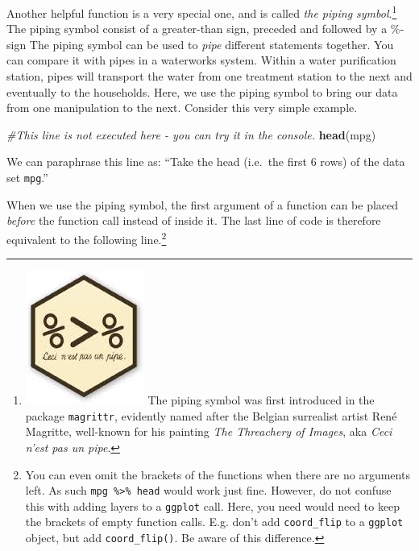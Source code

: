 \documentclass[]{tufte-book}
\newenvironment{Shaded}{}{}
\newcommand{\CommentTok}[1]{\textcolor[rgb]{0.38,0.63,0.69}{\textit{#1}}}
\newcommand{\KeywordTok}[1]{\textcolor[rgb]{0.00,0.44,0.13}{\textbf{#1}}}
\newcommand{\NormalTok}[1]{#1}
\newcommand{\OperatorTok}[1]{\textcolor[rgb]{0.40,0.40,0.40}{#1}}
\newcommand{\StringTok}[1]{\textcolor[rgb]{0.25,0.44,0.63}{#1}}
\begin{document}
Another helpful function is a very special one, and is called \emph{the piping symbol}.\footnote{\includegraphics{images/pipe.jpg} The piping symbol was first introduced in the package \texttt{magrittr}, evidently named after the Belgian surrealist artist René Magritte, well-known for his painting \emph{The Threachery of Images}, aka \emph{Ceci n'est pas un pipe}.} The piping symbol consist of a greater-than sign, preceded and followed by a \%-sign The piping symbol can be used to \emph{pipe} different statements together. You can compare it with pipes in a waterworks system. Within a water purification station, pipes will transport the water from one treatment station to the next and eventually to the households. Here, we use the piping symbol to bring our data from one manipulation to the next. Consider this very simple example.

\begin{Shaded}
\begin{Highlighting}[]
\CommentTok{#This line is not executed here - you can try it in the console.}
\KeywordTok{head}\NormalTok{(mpg)}
\end{Highlighting}
\end{Shaded}

We can paraphrase this line as: ``Take the head (i.e.~the first 6 rows) of the data set \texttt{mpg}.''

When we use the piping symbol, the first argument of a function can be placed \emph{before} the function call instead of inside it. The last line of code is therefore equivalent to the following line.\footnote{You can even omit the brackets of the functions when there are no arguments left. As such \texttt{mpg\ \%\textgreater{}\%\ head} would work just fine. However, do not confuse this with adding layers to a \texttt{ggplot} call. Here, you need would need to keep the brackets of empty function calls. E.g. don't add \texttt{coord\_flip} to a \texttt{ggplot} object, but add \texttt{coord\_flip()}. Be aware of this difference.}

\begin{Shaded}
\end{Shaded}
\end{document}

